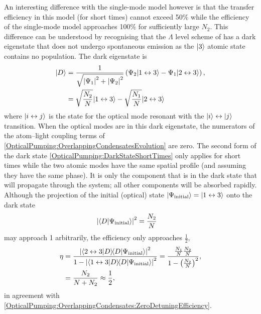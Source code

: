 An interesting difference with the single-mode model however is that the transfer efficiency in this model (for short times) cannot exceed 50\% while the efficiency of the single-mode model approaches 100\% for sufficiently large $N_2$.  This difference can be understood by recognising that the $\Lambda$ level scheme of  has a dark eigenstate that does not undergo spontaneous emission as the ${\left|3\right>}$ atomic state contains no population.  The dark eigenstate is
\begin{align}
    \ket{D} &= \frac{1}{\sqrt{\abs{\Psi_1}^2 + \abs{\Psi_2}^2}} \left(\Psi_2 \ket{1 \leftrightarrow 3}- \Psi_1 \ket{2\leftrightarrow 3}\right), \label{OpticalPumping:DarkState}\\
    &= \sqrt{\frac{N_2}{N}} \ket{1 \leftrightarrow 3} - \sqrt{\frac{N_1}{N}} \ket{2 \leftrightarrow 3} \label{OpticalPumping:DarkStateShortTimes}
\end{align}
where ${\left|i \leftrightarrow j\right>}$ is the state for the optical mode resonant with the ${\left|i\right>} \leftrightarrow {\ensuremath{\left|j\right>}}$ transition.  When the optical modes are in this dark eigenstate, the numerators of the atom--light coupling terms of \eqref{OpticalPumping:OverlappingCondensatesEvolution} are zero.  The second form of the dark state \eqref{OpticalPumping:DarkStateShortTimes} only applies for short times while the two atomic modes have the same spatial profile (and assuming they have the same phase).  It is only the component that is in the dark state that will propagate through the system; all other components will be absorbed rapidly.  Although the projection of the initial (optical) state ${\left|\Psi_\text{initial}\right>} = {\left|1 \leftrightarrow 3\right>}$ onto the dark state
\begin{align}
    \left|\left<D\middle|\Psi_\text{initial}\right>\right|^2 &= \frac{N_2}{N}
\end{align}
may approach 1 arbitrarily, the efficiency only approaches $\frac{1}{2}$,
\begin{align}
    \eta &= \frac{\left|\left<2 \leftrightarrow 3\middle|D\right> \!\!\left<D\middle|\Psi_\text{initial}\right>\right|^2}{1 - \left|\left<1 \leftrightarrow 3\middle|D\right> \!\! \left<D\middle|\Psi_\text{initial}\right>\right|^2} = \frac{\frac{N_1}{N} \frac{N_2}{N}}{1 - \left(\frac{N_2}{N}\right)^2}, \notag\\
    &= \frac{N_2}{N + N_2} \approx \frac{1}{2},
\end{align}
in agreement with \eqref{OpticalPumping:OverlappingCondensates:ZeroDetuningEfficiency}.


